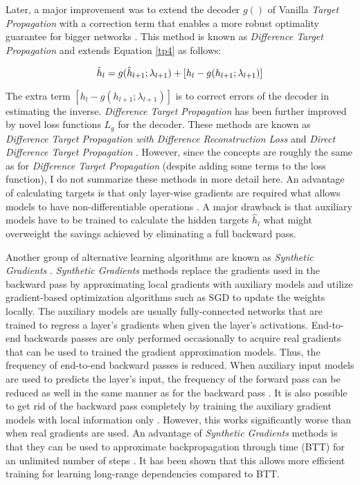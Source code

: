 Later, a major improvement was to extend the decoder $g()$ of Vanilla \emph{Target Propagation} with a correction term that enables a more robust optimality guarantee for bigger networks .
This method is known as \emph{Difference Target Propagation} and extends Equation \eqref*{tp4} as follows:

\begin{equation}\eqlbl{tp6}
	\hat{h}_l = g(\hat{h}_{l+1}; \lambda_{l+1}) + [h_l - g(h_{l+1}; \lambda_{l+1})]
\end{equation}

The extra term $[h_l - g(h_{l+1}; \lambda_{l+1})]$ is to correct errors of the decoder in estimating the inverse.
\emph{Difference Target Propagation} has been further improved by novel loss functions $L_{g}$ for the decoder.
These methods are known as \emph{Difference Target Propagation with Difference Reconstruction Loss} and \emph{Direct Difference Target Propagation} .
However, since the concepts are roughly the same as for \emph{Difference Target Propagation} (despite adding some terms to the loss function), I do not summarize these methods in more detail here.
An advantage of calculating targets is that only layer-wise gradients are required what allows models to have non-differentiable operations \cite{Lee_Zhang_Fischer_Bengio_2015}.
A major drawback is that auxiliary models have to be trained to calculate the hidden targets $\hat{h}_l$ what might overweight the savings achieved by eliminating a full backward pass.

Another group of alternative learning algorithms are known as \emph{Synthetic Gradients} .
\emph{Synthetic Gradients} methods replace the gradients used in the backward pass by approximating local gradients with auxiliary models and utilize gradient-based optimization algorithms such as SGD to update the weights locally.
The auxiliary models are usually fully-connected networks that are trained to regress a layer's gradients when given the layer's activations.
End-to-end backwards passes are only performed occasionally to acquire real gradients that can be used to trained the gradient approximation models.
Thus, the frequency of end-to-end backward passes is reduced.
When auxiliary input models are used to predicts the layer's input, the frequency of the forward pass can be reduced as well in the same manner as for the backward pass \cite{pmlr-v70-jaderberg17a}.
It is also possible to get rid of the backward pass completely by training the auxiliary gradient models with local information only .
However, this works significantly worse than when real gradients are used.
An advantage of \emph{Synthetic Gradients} methods is that they can be used to approximate backpropagation through time (BTT) for an unlimited number of steps \cite{pmlr-v70-jaderberg17a}.
It has been shown that this allows more efficient training for learning long-range dependencies compared to BTT.


